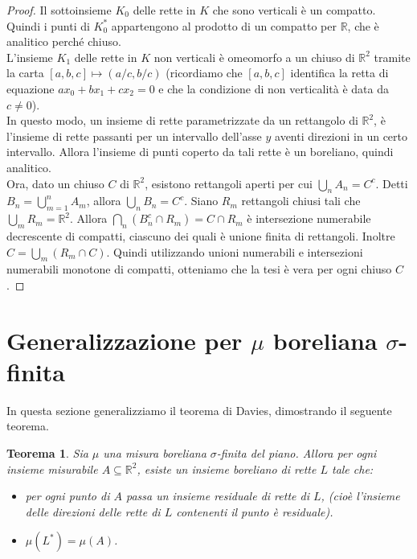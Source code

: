\documentclass[a4paper, twoside,openright]{article}
\newcommand{\R}{\mathbb{R}}
\newcommand{\<}{\langle}
\renewcommand{\>}{\rangle}
\newtheorem{teo}{Teorema}[]
\begin{document}
\begin{proof}
Il sottoinsieme $K_0$ delle rette in $K$ che sono verticali è un compatto. Quindi i punti di $K_0^*$ appartengono al prodotto di un compatto per $\R$, che è analitico perché chiuso.\\

L'insieme $K_1$ delle rette in $K$ non verticali è omeomorfo a un chiuso di $\R^2$ tramite la carta $[a,b,c] \mapsto (a/c,b/c)$ (ricordiamo che $[a,b,c]$ identifica la retta di equazione $ax_0+bx_1+cx_2=0$ e che la condizione di non verticalità è data da $c \neq 0$).\\
In questo modo, un insieme di rette parametrizzate da un rettangolo di $\R^2$, è l'insieme di rette passanti per un intervallo dell'asse $y$ aventi direzioni in un certo intervallo. Allora l'insieme di punti coperto da tali rette è un boreliano, quindi analitico.\\
Ora, dato un chiuso $C$ di $\R^2$, esistono rettangoli aperti per cui $\bigcup_n A_n = C^c$. Detti $B_n = \bigcup_{m=1}^n A_m$, allora $\bigcup_n B_n = C^c$. Siano $R_m$ rettangoli chiusi tali che $\bigcup_m R_m = \R^2$. Allora $\bigcap_n(B_n^c \cap R_m)=C \cap R_m$ è intersezione numerabile decrescente di compatti, ciascuno dei quali è unione finita di rettangoli. Inoltre $C=\bigcup_m(R_m \cap C)$. Quindi utilizzando unioni numerabili e intersezioni numerabili monotone di compatti, otteniamo che la tesi è vera per ogni chiuso $C$.
\end{proof}
\newpage


\section{Generalizzazione per $\mu$ boreliana $\sigma$-finita}

In questa sezione generalizziamo il teorema di Davies, dimostrando il seguente teorema.


\begin{teo} \label{teo1}
	Sia $\mu$ una misura boreliana $\sigma$-finita del piano. Allora per ogni insieme misurabile $A \subseteq \mathbb{R}^{2}$, esiste un insieme boreliano di rette $L$ tale che:
	\begin{itemize}
		\item per ogni punto di $A$ passa un insieme residuale di rette di $L$, (cioè l'insieme delle direzioni delle rette di $L$ contenenti il punto è residuale).
		\item $\mu\left(L^{*}\right)=\mu(A)$.
	\end{itemize}
\end{teo}
\end{document}
